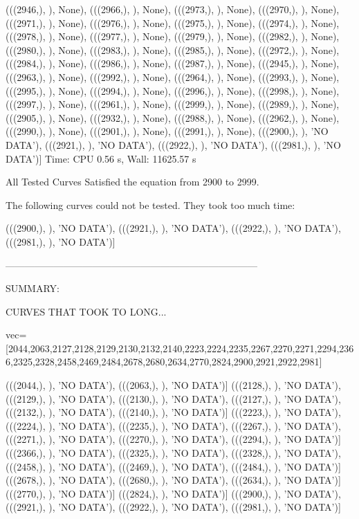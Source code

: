  (((2946,), {}), None),
 (((2966,), {}), None),
 (((2973,), {}), None),
 (((2970,), {}), None),
 (((2971,), {}), None),
 (((2976,), {}), None),
 (((2975,), {}), None),
 (((2974,), {}), None),
 (((2978,), {}), None),
 (((2977,), {}), None),
 (((2979,), {}), None),
 (((2982,), {}), None),
 (((2980,), {}), None),
 (((2983,), {}), None),
 (((2985,), {}), None),
 (((2972,), {}), None),
 (((2984,), {}), None),
 (((2986,), {}), None),
 (((2987,), {}), None),
 (((2945,), {}), None),
 (((2963,), {}), None),
 (((2992,), {}), None),
 (((2964,), {}), None),
 (((2993,), {}), None),
 (((2995,), {}), None),
 (((2994,), {}), None),
 (((2996,), {}), None),
 (((2998,), {}), None),
 (((2997,), {}), None),
 (((2961,), {}), None),
 (((2999,), {}), None),
 (((2989,), {}), None),
 (((2905,), {}), None),
 (((2932,), {}), None),
 (((2988,), {}), None),
 (((2962,), {}), None),
 (((2990,), {}), None),
 (((2901,), {}), None),
 (((2991,), {}), None),
 (((2900,), {}), 'NO DATA'),
 (((2921,), {}), 'NO DATA'),
 (((2922,), {}), 'NO DATA'),
 (((2981,), {}), 'NO DATA')]
Time: CPU 0.56 s, Wall: 11625.57 s

All Tested Curves Satisfied the equation from 2900 to 2999.  
  
The following curves could not be tested.
They took too much time:

 (((2900,), {}), 'NO DATA'),
 (((2921,), {}), 'NO DATA'),
 (((2922,), {}), 'NO DATA'),
 (((2981,), {}), 'NO DATA')]

 ------------------------------------------------------------------------------

 SUMMARY:

 CURVES THAT TOOK TO LONG...

vec=[2044,2063,2127,2128,2129,2130,2132,2140,2223,2224,2235,2267,2270,2271,2294,2366,2325,2328,2458,2469,2484,2678,2680,2634,2770,2824,2900,2921,2922,2981]
 
  (((2044,), {}), 'NO DATA'),
(((2063,), {}), 'NO DATA')]
 (((2128,), {}), 'NO DATA'),
 (((2129,), {}), 'NO DATA'),
 (((2130,), {}), 'NO DATA'),
 (((2127,), {}), 'NO DATA'),
 (((2132,), {}), 'NO DATA'),
(((2140,), {}), 'NO DATA')]
 (((2223,), {}), 'NO DATA'),
 (((2224,), {}), 'NO DATA'),
 (((2235,), {}), 'NO DATA'),
 (((2267,), {}), 'NO DATA'),
 (((2271,), {}), 'NO DATA'),
 (((2270,), {}), 'NO DATA'),
(((2294,), {}), 'NO DATA')]
 (((2366,), {}), 'NO DATA'),
 (((2325,), {}), 'NO DATA'),
 (((2328,), {}), 'NO DATA'),
 (((2458,), {}), 'NO DATA'),
 (((2469,), {}), 'NO DATA'),
(((2484,), {}), 'NO DATA')]
 (((2678,), {}), 'NO DATA'),
 (((2680,), {}), 'NO DATA'),
(((2634,), {}), 'NO DATA')]
(((2770,), {}), 'NO DATA')]
(((2824,), {}), 'NO DATA')]
(((2900,), {}), 'NO DATA'),
 (((2921,), {}), 'NO DATA'),
 (((2922,), {}), 'NO DATA'),
 (((2981,), {}), 'NO DATA')]
 
